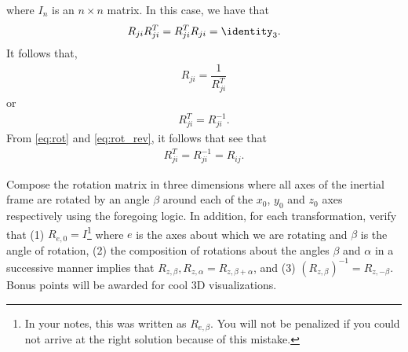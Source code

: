 \begin{solution}
	where $I_n$ is an $n \times n$ matrix. In this case, we have that 
	\begin{align}
	R_{ji} R_{ji}^T = R_{ji}^T R_{ji} = \identity_3.
	\end{align}
	It follows that, 
	\begin{align}
	R_{ji} = \dfrac{1}{R_{ji}^T}
	\end{align}
	or 
	\begin{align}
	R_{ji}^T = R_{ji}^{-1}. 
	\end{align}
	From \eqref{eq:rot} and \eqref{eq:rot_rev}, it follows that see that
	\begin{align}
	R_{ji}^T = R_{ji}^{-1} = R_{ij}. 
	\end{align}
\end{solution}


\begin{homework}
	Compose the rotation matrix in three dimensions where all axes of the inertial frame are rotated by an angle $\beta$ around each of the $x_0$, $y_0$ and $z_0$ axes respectively using the foregoing logic. In addition, for each transformation, verify that (1) $R_{e, 0} = I$\footnote{In your notes, this was written as $R_{e, \beta}$. You will not be penalized if you could not arrive at the right solution because of this mistake.} where $e$ is the axes about which we are rotating and $\beta$ is the angle of rotation, (2) the composition of rotations about the angles $\beta$ and $\alpha$ in a successive manner implies that $R_{z, \beta}, R_{z, \alpha} = R_{z, \beta + \alpha}$, and (3) ${(R_{z, \beta})}^{-1} = R_{z, -\beta}$. Bonus points will be awarded for cool 3D visualizations.
\end{homework} 

